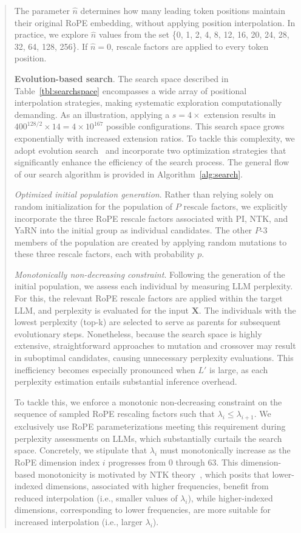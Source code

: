 \begin{abstract}
The parameter $\hat{n}$ determines how many leading token positions maintain their original RoPE embedding, without applying position interpolation. In practice, we explore $\hat{n}$ values from the set \{0, 1, 2, 4, 8, 12, 16, 20, 24, 28, 32, 64, 128, 256\}. If $\hat{n}=0$, rescale factors are applied to every token position.

\textbf{Evolution-based search}. The search space described in Table~\ref{tbl:searchspace} encompasses a wide array of positional interpolation strategies, making systematic exploration computationally demanding. As an illustration, applying a $s=4\times$ extension results in $400^{128/2}\times14 = 4\times10^{167}$ possible configurations. This search space grows exponentially with increased extension ratios. To tackle this complexity, we adopt evolution search~\cite{guo2020single} and incorporate two optimization strategies that significantly enhance the efficiency of the search process. The general flow of our search algorithm is provided in Algorithm~\ref{alg:search}.

\textit{Optimized initial population generation}. Rather than relying solely on random initialization for the population of $P$ rescale factors, we explicitly incorporate the three RoPE rescale factors associated with PI, NTK, and YaRN into the initial group as individual candidates. The other $P$-3 members of the population are created by applying random mutations to these three rescale factors, each with probability $p$.

\textit{Monotonically non-decreasing constraint}. Following the generation of the initial population, we assess each individual by measuring LLM perplexity. For this, the relevant RoPE rescale factors are applied within the target LLM, and perplexity is evaluated for the input $\mathbf{X}$. The individuals with the lowest perplexity (top-k) are selected to serve as parents for subsequent evolutionary steps. Nonetheless, because the search space is highly extensive, straightforward approaches to mutation and crossover may result in suboptimal candidates, causing unnecessary perplexity evaluations. This inefficiency becomes especially pronounced when $L'$ is large, as each perplexity estimation entails substantial inference overhead.

To tackle this, we enforce a monotonic non-decreasing constraint on the sequence of sampled RoPE rescaling factors such that $\lambda_i \le \lambda_{i+1}$. We exclusively use RoPE parameterizations meeting this requirement during perplexity assessments on LLMs, which substantially curtails the search space. Concretely, we stipulate that $\lambda_i$ must monotonically increase as the RoPE dimension index $i$ progresses from $0$ through $63$. This dimension-based monotonicity is motivated by NTK theory~\cite{jacot2018neural,tancik2020fourier,ntk}, which posits that lower-indexed dimensions, associated with higher frequencies, benefit from reduced interpolation (i.e., smaller values of $\lambda_i$), while higher-indexed dimensions, corresponding to lower frequencies, are more suitable for increased interpolation (i.e., larger $\lambda_i$).


\end{abstract}
